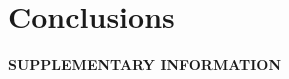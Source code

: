 \documentclass[aps,prl,superscriptaddress,twocolumn]{revtex4}
\begin{document}
\section{Conclusions}


%

\begin{acknowledgments}
\end{acknowledgments}
\newpage
\appendix
\begin{center}
{\bf SUPPLEMENTARY INFORMATION}
\end{center}
\end{document}
